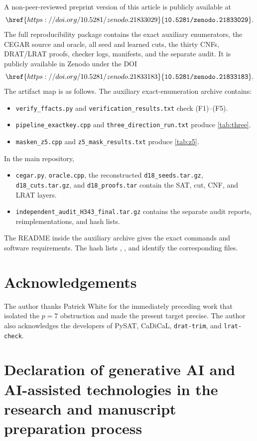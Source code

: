 \documentclass[11pt]{amsart}
\theoremstyle{definition}
\begin{document}
A non-peer-reviewed preprint version of this article is publicly
available at
\[
\href{https://doi.org/10.5281/zenodo.21833029}{\texttt{10.5281/zenodo.21833029}}.
\]
The full reproducibility package contains the exact auxiliary enumerators,
the CEGAR source and oracle, all seed and learned cuts, the thirty CNFs,
DRAT/LRAT proofs, checker logs, manifests, and the separate audit.  It is
publicly available in Zenodo
\cite{VolkmannData2026} under the DOI
\[
\href{https://doi.org/10.5281/zenodo.21833183}{\texttt{10.5281/zenodo.21833183}}.
\]
\begingroup\small
The artifact map is as follows.
The auxiliary exact-enumeration archive contains:
\begin{itemize}[leftmargin=*,nosep]
\item \texttt{verify\_ffacts.py} and
      \texttt{verification\_results.txt} check (F1)--(F5).
\item \texttt{pipeline\_exactkey.cpp} and
      \texttt{three\_direction\_run.txt} produce \cref{tab:three}.
\item \texttt{masken\_z5.cpp} and \texttt{z5\_mask\_results.txt}
      produce \cref{tab:z5}.
\end{itemize}
In the main repository,
\begin{itemize}[leftmargin=*,nosep]
\item \texttt{cegar.py}, \texttt{oracle.cpp}, the reconstructed
      \texttt{d18\_seeds.tar.gz}, \texttt{d18\_cuts.tar.gz}, and
      \texttt{d18\_proofs.tar} contain the SAT, cut, CNF, and LRAT layers.
\item \texttt{independent\_audit\_H343\_final.tar.gz} contains the
      separate audit reports, reimplementations, and hash lists.
\end{itemize}
The README inside the auxiliary archive gives the exact commands and software
requirements.  The hash lists ,
, and  identify the
corresponding files.
\par\endgroup

\section*{Acknowledgements}

The author thanks Patrick White for the immediately preceding work that isolated the $p=7$ obstruction and made the present target precise. The author also acknowledges the developers of PySAT, CaDiCaL, \texttt{drat-trim}, and \texttt{lrat-check}.

\section*{Declaration of generative AI and AI-assisted technologies in the research and manuscript preparation process}
\end{document}

